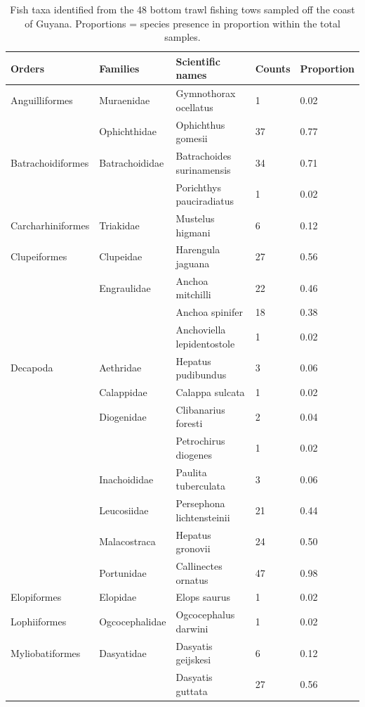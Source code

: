 \documentclass[
]{book}
\begin{document}
\begin{table}

\caption{\label{tab:unnamed-chunk-7}Fish taxa identified from the 48 bottom trawl fishing tows sampled off the coast of Guyana. Proportions = species presence in proportion within the total samples.}
\centering
\begin{tabular}[t]{l|l|l|l|l}
\hline
\textbf{Orders} & \textbf{Families} & \textbf{Scientific names} & \textbf{Counts} & \textbf{Proportion}\\
\hline
Anguilliformes & Muraenidae & Gymnothorax ocellatus & 1 & 0.02\\
\hline
 & Ophichthidae & Ophichthus gomesii & 37 & 0.77\\
\hline
Batrachoidiformes & Batrachoididae & Batrachoides surinamensis & 34 & 0.71\\
\hline
 &  & Porichthys pauciradiatus & 1 & 0.02\\
\hline
Carcharhiniformes & Triakidae & Mustelus higmani & 6 & 0.12\\
\hline
Clupeiformes & Clupeidae & Harengula jaguana & 27 & 0.56\\
\hline
 & Engraulidae & Anchoa mitchilli & 22 & 0.46\\
\hline
 &  & Anchoa spinifer & 18 & 0.38\\
\hline
 &  & Anchoviella lepidentostole & 1 & 0.02\\
\hline
Decapoda & Aethridae & Hepatus pudibundus & 3 & 0.06\\
\hline
 & Calappidae & Calappa sulcata & 1 & 0.02\\
\hline
 & Diogenidae & Clibanarius foresti & 2 & 0.04\\
\hline
 &  & Petrochirus diogenes & 1 & 0.02\\
\hline
 & Inachoididae & Paulita tuberculata & 3 & 0.06\\
\hline
 & Leucosiidae & Persephona lichtensteinii & 21 & 0.44\\
\hline
 & Malacostraca & Hepatus gronovii & 24 & 0.50\\
\hline
 & Portunidae & Callinectes ornatus & 47 & 0.98\\
\hline
Elopiformes & Elopidae & Elops saurus & 1 & 0.02\\
\hline
Lophiiformes & Ogcocephalidae & Ogcocephalus darwini & 1 & 0.02\\
\hline
Myliobatiformes & Dasyatidae & Dasyatis geijskesi & 6 & 0.12\\
\hline
 &  & Dasyatis guttata & 27 & 0.56\\

\end{tabular}
\end{table}
\end{document}
